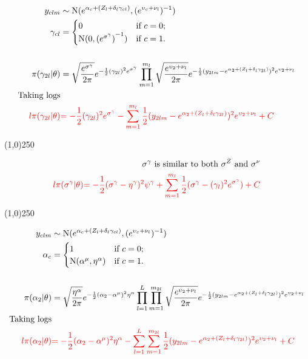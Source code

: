 \begin{align*}
y_{clm} &\sim \operatorname{N}(e^{\alpha_{c}+(Z_{l}+\delta_{l}\gamma_{cl})},(e^{ \upsilon_{c}+\nu_{l}  })^{-1})\\
\gamma_{cl}&=\begin{cases}
0  & \text{if } c=0;\\
\operatorname{N}(0,{(e^{\sigma^{\gamma}})}^{-1}) & \text{if } c=1.
\end{cases}\\
\\
\pi(\gamma_{2l}|\theta)&=\sqrt{\frac{e^{\sigma^{\gamma}}}{2\pi}} e^{-\frac{1}{2}(\gamma_{2l})^{2}e^{\sigma^{\gamma}} }
\prod_{m=1}^{m_{l}}\sqrt{\frac{e^{ \upsilon_{2}+\nu_{l} }}{2\pi}} e^{-\frac{1}{2}(y_{2lm}-e^{\alpha_{2}+(Z_{l}+\delta_{l}\gamma_{2l})})^{2}e^{ \upsilon_{2}+\nu_{l} } }\\
\text{Taking logs}\\
\color{red}{l\pi(\gamma_{2l}|\theta)}&
\color{red}{
=-\frac{1}{2}(\gamma_{2l})^{2}e^{\sigma^{\gamma}}
-
\sum_{m=1}^{m_{l}}\frac{1}{2}(y_{2lm}-e^{\alpha_{2}+(Z_{l}+\delta_{l}\gamma_{2l})})^{2}e^{\upsilon_{2}+\nu_{l}}
+C
}
\end{align*}

\begin{center}
\line(1,0){250}
\end{center}

\begin{align*}
\text{$\sigma^{\gamma}$ is similar to both $\sigma^{Z}$ and $\sigma^{\nu}$}\\
\color{red}{l\pi(\sigma^{\gamma}|\theta)}
\color{red}{
=-\frac{1}{2}(\sigma^{\gamma}-\eta^{\gamma})^{2}\psi^{\gamma}
+
\sum_{m=1}^{m_{l}}\frac{1}{2}(\sigma^{\gamma} -(\gamma_{l})^{2}e^{\sigma^{\gamma}})
+C}
\end{align*}
\begin{center}
\line(1,0){250}
\end{center}

\begin{align*}
y_{clm} &\sim \operatorname{N}(e^{\alpha_{c}+(Z_{l}+\delta_{l}\gamma_{cl})},(e^{ \upsilon_{c}+\nu_{l}  })^{-1})\\
\alpha_{c}&=\begin{cases}
1  & \text{if } c=0;\\
\operatorname{N}(\alpha^\mu,\eta^{\alpha}) & \text{if } c=1.
\end{cases}\\
\\
\pi(\alpha_{2}|\theta)&=\sqrt{\frac{\eta^{\alpha}}{2\pi}} e^{-\frac{1}{2}(\alpha_{2}-\alpha^\mu)^{2}\eta^{\alpha} }
\prod_{l=1}^{L}\prod_{m=1}^{m_{2l}}\sqrt{\frac{e^{ \upsilon_{2}+\nu_{l} }}{2\pi}} e^{-\frac{1}{2}(y_{2lm}-e^{\alpha_{2}+(Z_{l}+\delta_{l}\gamma_{2l})})^{2}e^{ \upsilon_{2}+\nu_{l} } }\\
\text{Taking logs}\\
\color{red}{l\pi(\alpha_{2}|\theta)}&
\color{red}{
=-\frac{1}{2}(\alpha_{2}-\alpha^\mu)^{2}\eta^{\alpha}
-
\sum_{l=1}^{L}\sum_{m=1}^{m_{2l}}\frac{1}{2}(y_{2lm}-e^{\alpha_{2}+(Z_{l}+\delta_{l}\gamma_{2l})})^{2}e^{\upsilon_{2}+\nu_{l}}
+C
}
\end{align*}



